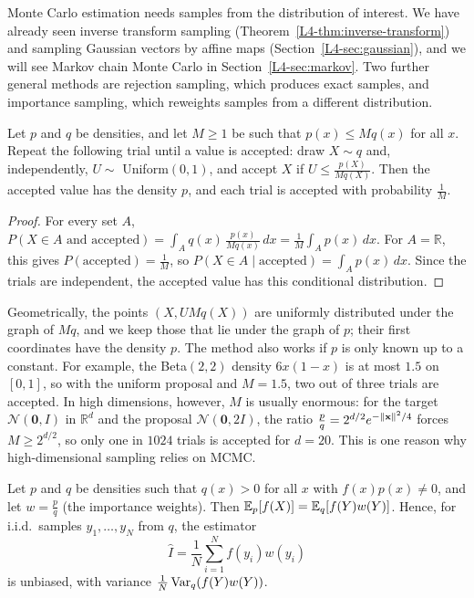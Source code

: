 Monte Carlo estimation needs samples from the distribution of interest. We have already seen inverse transform sampling (Theorem~\ref{L4-thm:inverse-transform}) and sampling Gaussian vectors by affine maps (Section~\ref{L4-sec:gaussian}), and we will see Markov chain Monte Carlo in Section~\ref{L4-sec:markov}. Two further general methods are rejection sampling, which produces exact samples, and importance sampling, which reweights samples from a different distribution.

\begin{theorem}\label{L4-thm:rejection}
    Let $p$ and $q$ be densities, and let $M \geq 1$ be such that $p(x) \leq Mq(x)$ for all $x$. Repeat the following trial until a value is accepted: draw $X \sim q$ and, independently, $U \sim$ Uniform$(0, 1)$, and accept $X$ if $U \leq \frac{p(X)}{Mq(X)}$. Then the accepted value has the density $p$, and each trial is accepted with probability $\frac{1}{M}$.
\end{theorem}

\begin{proof}
    For every set $A$, $P(X \in A \text{ and accepted}) = \int_A q(x)\,\frac{p(x)}{Mq(x)}\, dx = \frac{1}{M}\int_A p(x)\, dx$. For $A = \mathbb{R}$, this gives $P(\text{accepted}) = \frac{1}{M}$, so $P(X \in A \mid \text{accepted}) = \int_A p(x)\, dx$. Since the trials are independent, the accepted value has this conditional distribution.
\end{proof}

Geometrically, the points $(X, UMq(X))$ are uniformly distributed under the graph of $Mq$, and we keep those that lie under the graph of $p$; their first coordinates have the density $p$. The method also works if $p$ is only known up to a constant. For example, the Beta$(2, 2)$ density $6x(1 - x)$ is at most $1.5$ on $[0, 1]$, so with the uniform proposal and $M = 1.5$, two out of three trials are accepted. In high dimensions, however, $M$ is usually enormous: for the target $\mathcal{N}(\mathbf{0}, I)$ in $\mathbb{R}^d$ and the proposal $\mathcal{N}(\mathbf{0}, 2I)$, the ratio $\frac{p}{q} = 2^{d/2}e^{-\lVert \mathbf{x} \rVert^2/4}$ forces $M \geq 2^{d/2}$, so only one in $1024$ trials is accepted for $d = 20$. This is one reason why high-dimensional sampling relies on MCMC.

\begin{proposition}\label{L4-prop:importance}
    Let $p$ and $q$ be densities such that $q(x) > 0$ for all $x$ with $f(x)p(x) \neq 0$, and let $w = \frac{p}{q}$ (the importance weights). Then $\mathbb{E}_p[f(X)] = \mathbb{E}_q[f(Y)w(Y)]$. Hence, for i.i.d.\ samples $y_1, \ldots, y_N$ from $q$, the estimator
    \[\hat I = \frac{1}{N}\sum_{i=1}^N f(y_i)w(y_i)\]
    is unbiased, with variance $\frac{1}{N}\operatorname{Var}_q(f(Y)w(Y))$.
\end{proposition}

